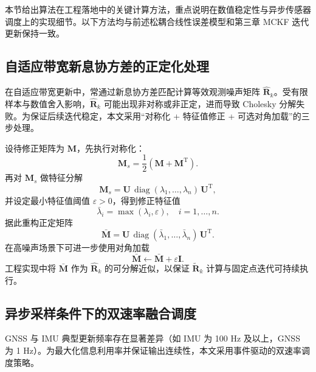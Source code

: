 本节给出算法在工程落地中的关键计算方法，重点说明在数值稳定性与异步传感器调度上的实现细节。以下方法均与前述松耦合线性误差模型和第三章 MCKF 迭代更新保持一致。

\subsection{自适应带宽新息协方差的正定化处理}

在自适应带宽更新中，常通过新息协方差匹配计算等效观测噪声矩阵 $\hat{\bm{R}}_k$。受有限样本与数值舍入影响，$\hat{\bm{R}}_k$ 可能出现非对称或非正定，进而导致 Cholesky 分解失败。为保证后续迭代稳定，本文采用“对称化 + 特征值修正 + 可选对角加载”的三步处理。

设待修正矩阵为 $\bm{M}$，先执行对称化：
\begin{equation}
	\bm{M}_s=\frac{1}{2}\left(\bm{M}+\bm{M}^{\mathrm T}\right).
	\label{eq:ch4_spd_sym}
\end{equation}
再对 $\bm{M}_s$ 做特征分解
\begin{equation}
	\bm{M}_s=\bm{U}\,\operatorname{diag}(\lambda_1,\ldots,\lambda_n)\,\bm{U}^{\mathrm T},
\end{equation}
并设定最小特征值阈值 $\varepsilon>0$，得到修正特征值
\begin{equation}
	\bar{\lambda}_i=\max(\lambda_i,\varepsilon),\quad i=1,\ldots,n.
\end{equation}
据此重构正定矩阵
\begin{equation}
	\bar{\bm{M}}=\bm{U}\,\operatorname{diag}(\bar{\lambda}_1,\ldots,\bar{\lambda}_n)\,\bm{U}^{\mathrm T}.
	\label{eq:ch4_spd_rebuild}
\end{equation}
在高噪声场景下可进一步使用对角加载
\begin{equation}
	\bar{\bm{M}}\leftarrow\bar{\bm{M}}+\varepsilon\bm{I}.
	\label{eq:ch4_spd_loading}
\end{equation}
工程实现中将 $\bar{\bm{M}}$ 作为 $\hat{\bm{R}}_k$ 的可分解近似，以保证 $\tilde{\bm{R}}_k$ 计算与固定点迭代可持续执行。

\subsection{异步采样条件下的双速率融合调度}

GNSS 与 IMU 典型更新频率存在显著差异（如 IMU 为 100 Hz 及以上，GNSS 为 1 Hz）。为最大化信息利用率并保证输出连续性，本文采用事件驱动的双速率调度策略。

